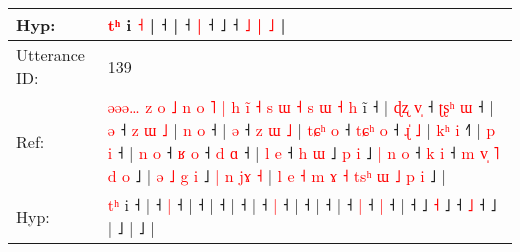 \documentclass[10pt]{article}
\DeclareRobustCommand{\hl}[1]{{\textcolor{red}{#1}}}
\begin{document}
\begin{longtable}{ll}
 \\
Hyp: & \hl{}\hl{}\hl{}\hl{}\hl{}\hl{}\hl{}\hl{}\hl{}\hl{}\hl{}\hl{t}\hl{ʰ} i \hl{˧} |\hl{}\hl{}\hl{}\hl{} ˧ |\hl{}\hl{}\hl{}\hl{}\hl{} ˧\hl{}\hl{} \hl{}\hl{|} ˧\hl{}\hl{}\hl{}\hl{}\hl{}\hl{}\hl{}\hl{}\hl{}\hl{} ˩\hl{}\hl{}\hl{}\hl{}\hl{}\hl{} ˧ \hl{}\hl{˩} \hl{|} \hl{˩} |
 \\
\midrule
Utterance ID: & 139 \\
Ref: & \hl{ə}\hl{ə}\hl{ə}\hl{…}\hl{ }\hl{z}\hl{ }\hl{o}\hl{ }\hl{˩}\hl{ }\hl{n}\hl{ }\hl{o}\hl{ }\hl{˥}\hl{ }\hl{|}\hl{ }\hl{h}\hl{ }\hl{i}\hl{̃}\hl{ }\hl{˧}\hl{ }\hl{s}\hl{ }\hl{ɯ}\hl{ }\hl{˧}\hl{ }\hl{s}\hl{ }\hl{ɯ}\hl{ }\hl{˧}\hl{ }\hl{h} i\hl{̃} ˧ |\hl{ }\hl{ɖ}\hl{ʐ}\hl{ }\hl{v}\hl{̩} ˧\hl{ }\hl{ʈ}\hl{ʂ}\hl{ʰ} \hl{ɯ} ˧ |\hl{ }\hl{ə} ˧\hl{ }\hl{z}\hl{ }\hl{ɯ}\hl{ }\hl{˩} |\hl{ }\hl{n}\hl{ }\hl{o} ˧ |\hl{ }\hl{ə} ˧\hl{ }\hl{z}\hl{ }\hl{ɯ}\hl{ }\hl{˩} |\hl{ }\hl{t}\hl{ɕ}\hl{ʰ}\hl{ }\hl{o} ˧\hl{ }\hl{t}\hl{ɕ}\hl{ʰ} \hl{o} ˧\hl{ }\hl{ɻ}\hl{̍}\hl{ }\hl{˩} |\hl{ }\hl{k}\hl{ʰ}\hl{ }\hl{i} ˧\hl{˥} |\hl{ }\hl{p}\hl{ }\hl{i} ˧ |\hl{ }\hl{n}\hl{ }\hl{o} ˧\hl{ }\hl{ʁ} \hl{o} ˧\hl{ }\hl{d} \hl{ɑ} ˧ |\hl{ }\hl{l}\hl{ }\hl{e} ˧\hl{ }\hl{h}\hl{ }\hl{ɯ} ˩\hl{ }\hl{p} \hl{i} ˩\hl{ }\hl{|}\hl{ }\hl{n}\hl{ }\hl{o} ˧\hl{ }\hl{k} \hl{i} ˧\hl{ }\hl{m}\hl{ }\hl{v}\hl{̩}\hl{ }\hl{˥}\hl{ }\hl{d}\hl{ }\hl{o} ˩ |\hl{ }\hl{ə}\hl{ }\hl{˩}\hl{ }\hl{g}\hl{ }\hl{i} ˩\hl{ }\hl{|}\hl{ }\hl{n}\hl{ }\hl{j}\hl{ɤ}\hl{ }\hl{˧} |\hl{ }\hl{l}\hl{ }\hl{e}\hl{ }\hl{˧}\hl{ }\hl{m}\hl{ }\hl{ɤ}\hl{ }\hl{˧}\hl{ }\hl{t}\hl{s}\hl{ʰ}\hl{ }\hl{ɯ}\hl{ }\hl{˩}\hl{ }\hl{p}\hl{ }\hl{i} ˩ |
 \\
Hyp: & \hl{}\hl{}\hl{}\hl{}\hl{}\hl{}\hl{}\hl{}\hl{}\hl{}\hl{}\hl{}\hl{}\hl{}\hl{}\hl{}\hl{}\hl{}\hl{}\hl{}\hl{}\hl{}\hl{}\hl{}\hl{}\hl{}\hl{}\hl{}\hl{}\hl{}\hl{}\hl{}\hl{}\hl{}\hl{}\hl{}\hl{}\hl{t}\hl{ʰ} i\hl{} ˧ |\hl{}\hl{}\hl{}\hl{}\hl{}\hl{} ˧\hl{}\hl{}\hl{}\hl{} \hl{|} ˧ |\hl{}\hl{} ˧\hl{}\hl{}\hl{}\hl{}\hl{}\hl{} |\hl{}\hl{}\hl{}\hl{} ˧ |\hl{}\hl{} ˧\hl{}\hl{}\hl{}\hl{}\hl{}\hl{} |\hl{}\hl{}\hl{}\hl{}\hl{}\hl{} ˧\hl{}\hl{}\hl{}\hl{} \hl{|} ˧\hl{}\hl{}\hl{}\hl{}\hl{} |\hl{}\hl{}\hl{}\hl{}\hl{} ˧\hl{} |\hl{}\hl{}\hl{}\hl{} ˧ |\hl{}\hl{}\hl{}\hl{} ˧\hl{}\hl{} \hl{|} ˧\hl{}\hl{} \hl{|} ˧ |\hl{}\hl{}\hl{}\hl{} ˧\hl{}\hl{}\hl{}\hl{} ˩\hl{}\hl{} \hl{˧} ˩\hl{}\hl{}\hl{}\hl{}\hl{}\hl{} ˧\hl{}\hl{} \hl{˩} ˧\hl{}\hl{}\hl{}\hl{}\hl{}\hl{}\hl{}\hl{}\hl{}\hl{}\hl{} ˩ |\hl{}\hl{}\hl{}\hl{}\hl{}\hl{}\hl{}\hl{} ˩\hl{}\hl{}\hl{}\hl{}\hl{}\hl{}\hl{}\hl{}\hl{} |\hl{}\hl{}\hl{}\hl{}\hl{}\hl{}\hl{}\hl{}\hl{}\hl{}\hl{}\hl{}\hl{}\hl{}\hl{}\hl{}\hl{}\hl{}\hl{}\hl{}\hl{}\hl{}\hl{}\hl{} ˩ |

\end{longtable}
\end{document}
